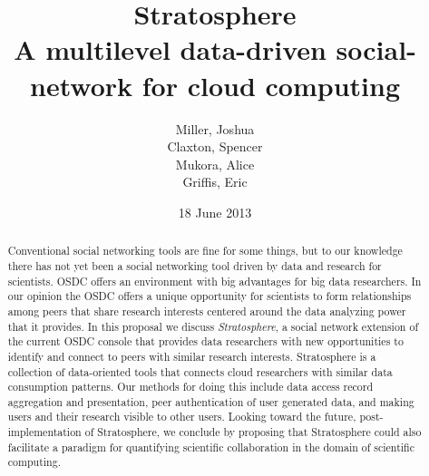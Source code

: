 

\usepackage{titlesec}
\titleformat{\subsection}[hang]{\centering\bfseries}{}{1em}{}

\title{
  Stratosphere \\ 
  \small{A multilevel data-driven social-network for cloud computing}
} 

\author{
  Miller, Joshua \\
  Claxton, Spencer \\
  Mukora, Alice \\
  Griffis, Eric
}

\date{\small{18 June 2013}}

\newcommand\XXX[1]{{\color{red} #1}}



\maketitle

\begin{abstract}

Conventional social networking tools are fine for some things, but
to our knowledge there has not yet been a social networking tool
driven by data and research for scientists. OSDC offers an
environment with big advantages for big data researchers. In our
opinion the OSDC offers a unique opportunity for scientists to form 
relationships among peers that share research interests centered
around the data analyzing power that it provides. In this proposal 
we discuss \emph{Stratosphere}, a social network extension of the current OSDC
console that provides data researchers with new opportunities to
identify and connect to peers with similar research interests.
Stratosphere is a collection of data-oriented tools that connects
cloud researchers with similar data consumption patterns. Our methods
for doing this include data access record aggregation and
presentation, peer authentication of user generated data, and making
users and their research visible to other users. Looking toward
the future, post-implementation of Stratosphere, we conclude by
proposing that Stratosphere could also facilitate a paradigm for
quantifying scientific collaboration in the domain of scientific
computing. 
 
\end{abstract}

